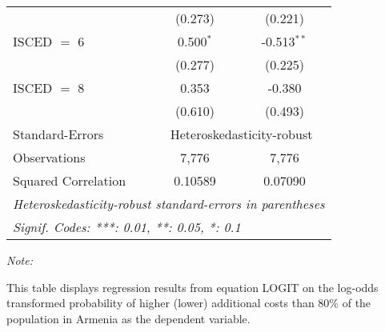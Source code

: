 \begin{table}[htbp!]
\begin{adjustbox}{width = 1\textwidth, max height = 0.95\textheight, center}
\begin{threeparttable}[b]
\begin{tabular}{lcc}
                                 & (0.273)        & (0.221)\\   
            ISCED $=$ 6          & 0.500$^{*}$    & -0.513$^{**}$\\   
                                 & (0.277)        & (0.225)\\   
            ISCED $=$ 8          & 0.353          & -0.380\\   
                                 & (0.610)        & (0.493)\\   
            \midrule 
            Standard-Errors & \multicolumn{2}{c}{Heteroskedasticity-robust} \\ 
            Observations         & 7,776          & 7,776\\  
            Squared Correlation  & 0.10589        & 0.07090\\  
            \midrule \midrule
            \multicolumn{3}{l}{\emph{Heteroskedasticity-robust standard-errors in parentheses}}\\
            \multicolumn{3}{l}{\emph{Signif. Codes: ***: 0.01, **: 0.05, *: 0.1}}\\
         \end{tabular}
         
         \begin{tablenotes}\item \medskip \textit{Note:}
            \item This table displays regression results from equation LOGIT on the log-odds transformed probability of higher (lower) additional costs than 80\% of the population in Armenia as the dependent variable. 
         \end{tablenotes}
      \end{threeparttable}
   \end{adjustbox}
\end{table}


